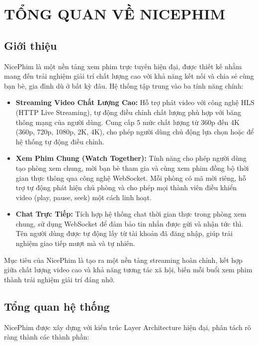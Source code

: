\newpage

\section{TỔNG QUAN VỀ NICEPHIM}

\subsection{Giới thiệu}

NicePhim là một nền tảng xem phim trực tuyến hiện đại, được thiết kế nhằm mang đến trải nghiệm giải trí chất lượng cao với khả năng kết nối và chia sẻ cùng bạn bè, gia đình dù ở bất kỳ đâu. Hệ thống tập trung vào ba tính năng chính:

\begin{itemize}
	\item \textbf{Streaming Video Chất Lượng Cao:} Hỗ trợ phát video với công nghệ HLS (HTTP Live Streaming), tự động điều chỉnh chất lượng phù hợp với băng thông mạng của người dùng. Cung cấp 5 mức chất lượng từ 360p đến 4K (360p, 720p, 1080p, 2K, 4K), cho phép người dùng chủ động lựa chọn hoặc để hệ thống tự động điều chỉnh.

	\item \textbf{Xem Phim Chung (Watch Together):} Tính năng cho phép người dùng tạo phòng xem chung, mời bạn bè tham gia và cùng xem phim đồng bộ thời gian thực thông qua công nghệ WebSocket. Mỗi phòng có mã mời riêng, hỗ trợ tự động phát hiện chủ phòng và cho phép mọi thành viên điều khiển video (play, pause, seek) một cách linh hoạt.

	\item \textbf{Chat Trực Tiếp:} Tích hợp hệ thống chat thời gian thực trong phòng xem chung, sử dụng WebSocket để đảm bảo tin nhắn được gửi và nhận tức thì. Tên người dùng được tự động lấy từ tài khoản đã đăng nhập, giúp trải nghiệm giao tiếp mượt mà và tự nhiên.
\end{itemize}

Mục tiêu của NicePhim là tạo ra một nền tảng streaming hoàn chỉnh, kết hợp giữa chất lượng video cao và khả năng tương tác xã hội, biến mỗi buổi xem phim thành trải nghiệm giải trí đáng nhớ.

\subsection{Tổng quan hệ thống}

NicePhim được xây dựng với kiến trúc Layer Architecture hiện đại, phân tách rõ ràng thành các thành phần:


